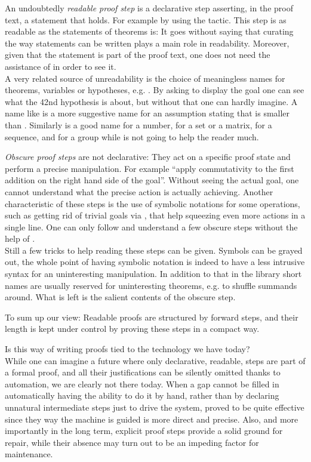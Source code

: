 An undoubtedly \emph{readable proof step} is a declarative step asserting,
in the proof text, a statement that holds. For example by using the
 tactic. This step is as readable as the statements of
theorems is: It goes without saying that curating the way statements
can be written plays a main role in readability. Moreover, given that
the statement is part of the proof text, one does not need
the assistance of \Coq{} in order to see it.\\
A very related source of unreadability
is the choice of meaningless names for theorems, variables or
hypotheses, e.g. . By asking \Coq{} to display the goal one can see
what the 42nd hypothesis is about, but without that one can hardly
imagine. A name like  is a more suggestive name for an
assumption stating that  is smaller than .
Similarly  is a good name for a number,  for a set or a
matrix,  for a sequence, and  for a group while 
is not going to help the reader much.

\emph{Obscure proof steps} are not declarative: They act on a specific proof
state and perform a precise manipulation. For example ``apply
commutativity to the first addition on the right hand side of the
goal''. Without seeing the actual goal, one cannot
understand what the precise action is actually achieving.
Another characteristic of these steps is the use of symbolic
notations for some operations, such as getting rid of trivial goals
via \C{//}, that help squeezing even more actions in a single line.
One can only follow and understand a few obscure steps without the help
of \Coq{}.\\
Still a few tricks to help reading these steps can be given. Symbols
can be grayed out, the whole point of having symbolic notation is
indeed to have a less intrusive syntax for an uninteresting
manipulation.
In addition to that in the \mcbMC{} library short names are usually
reserved for uninteresting theorems, e.g.  to shuffle summands
around. What is left is the salient contents of the obscure step.

To sum up our view: Readable proofs are structured by forward steps,
and their length is kept under control by proving these steps in a
compact way.

Is this way of writing proofs tied to the technology we have today?\\
While one can imagine a future where only declarative, readable, steps
are part of a formal proof, and all their justifications can be
silently omitted thanks to automation, we are clearly not there today.
When a gap cannot be filled in automatically having the ability to do
it by hand, rather than by declaring unnatural intermediate steps just to
drive the system, proved to be quite effective since they way the
machine is guided is more direct and precise.  Also, and more
importantly in the long term, explicit proof steps provide a solid
ground for repair, while their absence may turn out to be an impeding
factor for maintenance.

